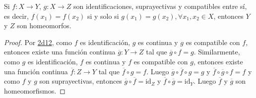 

\begin{corollary}
Si $f : X \longrightarrow Y$, $g : X \longrightarrow Z$ son identificaciones, suprayectivas y compatibles entre sí, es decir, $f(x_1) = f(x_2)$ si y solo si $g(x_1) = g(x_2), \forall x_1, x_2 \in X$, entonces $Y$ y $Z$ son homeomorfos.
\end{corollary}

\begin{proof}
Por \hyperref[card:2d12]{\textsf{2d12}}, como $f$ es identificación, $g$ es continua y $g$ es compatible con $f$, entonces existe una función continua $\overline{g} : Y \longrightarrow Z$ tal que $\overline{g} \circ f = g$. Similarmente, como $g$ es identificación, $f$ es continua y $f$ es compatible con $g$, entonces existe una función continua $\overline{f} : Z \longrightarrow Y$ tal que $\overline{f} \circ g = f$. Luego $\overline{g} \circ \overline{f} \circ g = g$ y $\overline{f} \circ \overline{g} \circ f = f$ y como $f$ y $g$ son suprayectivas, entonces $\overline{g} \circ \overline{f} = \text{id}_{Z}$ y $\overline{f} \circ \overline{g} =  \text{id}_{Y}$. Luego $\overline{f}$ y $\overline{g}$ son homeomorfismos.
\end{proof}
